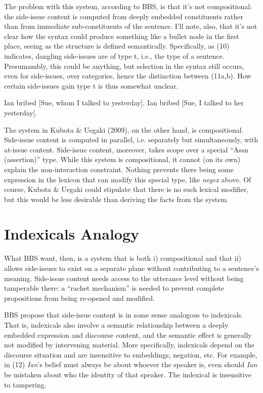 \documentclass[12pt]{article}
\begin{document}
\noindent The problem with this system, according to BBS, is that it's not compositional: the side-issue content is computed from deeply embedded constituents rather than from immediate sub-constituents of the sentence. I'll note, also, that it's not clear how the syntax could produce something like a bullet node in the first place, seeing as the structure is defined semantically. Specifically, as (10) indicates, dangling side-issues are of type \textrm{t}, i.e., the type of a sentence. Presumambly, this could be anything, but selection in the syntax still occurs, even for side-issues, over categories, hence the distinction between (11a,b). How certain side-issues gain type \textrm{t} is thus somewhat unclear.

\pex 
\a Ian bribed [Sue, whom I talked to yesterday].
\a *Ian bribed [Sue, I talked to her yesterday].
\xe

The system in Kubota \& Uegaki (2009), on the other hand, is compositional.  Side-issue content is computed in parallel, i.e. separately but simultaneously, with at-issue content. Side-issue content, moreover, takes scope over a special ``Assn (assertion)'' type. While this system is compositional, it cannot (on its own) explain the non-interaction constraint. Nothing prevents there being some expression in the lexicon that can modify this special type, like \textit{negex} above. Of course, Kubota \& Uegaki could stipulate that there is no such lexical modifier, but this would be less desirable than deriving the facts from the system.


\section{Indexicals Analogy}

What BBS want, then, is a system that is both i) compositional and that ii) allows side-issues to exist on a separate plane without contributing to a sentence's meaning. Side-issue content needs access to the utterance level without being tamperable there: a ``rachet mechanism'' is needed to prevent complete propositions from being re-opened and modified.

BBS propose that side-issue content is in some sense analogous to indexicals. That is, indexicals also involve a semantic relationship between a deeply embedded expression and discourse content, and the semantic effect is generally not modified by intervening material. More specifically, indexicals depend on the discourse situation and are insensitive to embeddings, negation, etc. For example, in (12) \textit{Ian}'s belief must always be about whoever the speaker is, even should \textit{Ian} be mistaken about who the identity of that speaker. The indexical is insensitive to tampering.
\end{document}
